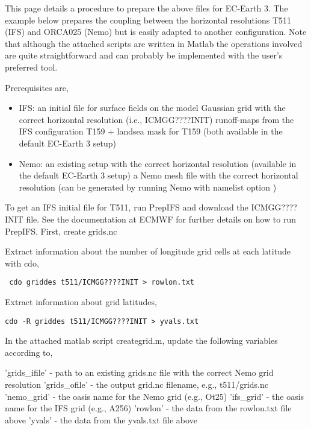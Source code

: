 This page details a procedure to prepare the above files for EC-Earth 3. The example below prepares the coupling between the horizontal resolutions T511 (IFS) and ORCA025 (Nemo) but is easily adapted to another configuration. Note that although the attached scripts are written in Matlab the operations involved are quite straightforward and can probably be implemented with the user's preferred tool.

Prerequisites are,
\begin{itemize}
  \item IFS:
        an initial file for surface fields on the model Gaussian grid with the correct horizontal resolution (i.e., ICMGG????INIT)
        runoff-maps from the IFS configuration T159 + landsea mask for T159 (both available in the default EC-Earth 3 setup)
  \item Nemo:
        an existing setup with the correct horizontal resolution (available in the default EC-Earth 3 setup)
        a Nemo mesh file with the correct horizontal resolution (can be generated by running Nemo with namelist option )        
\end{itemize}


To get an IFS initial file for T511, run PrepIFS and download the ICMGG????INIT file. See the documentation at ECMWF for further details on how to run PrepIFS.
First, create grids.nc

Extract information about the number of longitude grid cells at each latitude with cdo,

\begin{verbatim}
 cdo griddes t511/ICMGG????INIT > rowlon.txt 
\end{verbatim}



Extract information about grid latitudes,

\begin{verbatim}
cdo -R griddes t511/ICMGG????INIT > yvals.txt  
\end{verbatim}


In the attached matlab script creategrid.m, update the following variables according to,

    'grids\_ifile' - path to an existing grids.nc file with the correct Nemo grid resolution
    'grids\_ofile' - the output grid.nc filename, e.g., t511/grids.nc
    'nemo\_grid' - the oasis name for the Nemo grid (e.g., Ot25)
    'ifs\_grid' - the oasis name for the IFS grid (e.g., A256)
    'rowlon' - the data from the rowlon.txt file above
    'yvals' - the data from the yvals.txt file above

